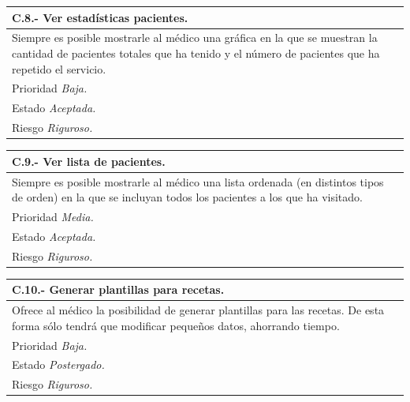 \documentclass[a4paper,oneside,11pt]{book}
\begin{document}
\begin{center}
\begin{tabulary}{15cm}{|L|}
	\hline
		\bf{C.8.- Ver estadísticas pacientes.} \\
	\hline
		Siempre es posible mostrarle al médico una gráfica en la que se muestran la cantidad de pacientes totales que ha tenido y el número de pacientes que ha repetido el servicio. \\
	\hline
		Prioridad \textit{Baja.} \\
	\hline
		Estado \textit{Aceptada.} \\
	\hline
		Riesgo \textit{Riguroso.} \\
	\hline
\end{tabulary}
\end{center}

\begin{center}
\begin{tabulary}{15cm}{|L|}
	\hline
		\bf{C.9.- Ver lista de pacientes.} \\
	\hline
		Siempre es posible mostrarle al médico una lista ordenada (en distintos tipos de orden) en la que se incluyan todos los pacientes a los que ha visitado. \\
	\hline
		Prioridad \textit{Media.} \\
	\hline
		Estado \textit{Aceptada.} \\
	\hline
		Riesgo \textit{Riguroso.} \\
	\hline
\end{tabulary}
\end{center}

\begin{center}
\begin{tabulary}{15cm}{|L|}
	\hline
		\bf{C.10.- Generar plantillas para recetas.} \\
	\hline
		Ofrece al médico la posibilidad de generar plantillas para las recetas. De esta forma sólo tendrá que modificar pequeños datos, ahorrando tiempo. \\
	\hline
		Prioridad \textit{Baja.} \\
	\hline
		Estado \textit{Postergado.} \\
	\hline
		Riesgo \textit{Riguroso.} \\
	\hline
\end{tabulary}
\end{center}
\end{document}
